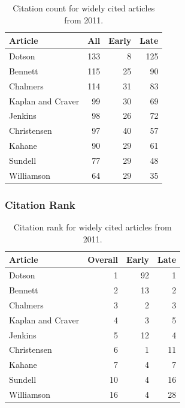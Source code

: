 \documentclass[
  10pt,
  letterpaper,
  DIV=11,
  numbers=noendperiod,
  twoside]{scrartcl}
\begin{document}
\begin{longtable}[]{@{}lrrr@{}}

\caption{\label{tbl-citation-count-2011}Citation count for widely cited
articles from 2011.}

\tabularnewline

\toprule\noalign{}
Article & All & Early & Late \\
\midrule\noalign{}
\endhead
\bottomrule\noalign{}
\endlastfoot
Dotson & 133 & 8 & 125 \\
Bennett & 115 & 25 & 90 \\
Chalmers & 114 & 31 & 83 \\
Kaplan and Craver & 99 & 30 & 69 \\
Jenkins & 98 & 26 & 72 \\
Christensen & 97 & 40 & 57 \\
Kahane & 90 & 29 & 61 \\
Sundell & 77 & 29 & 48 \\
Williamson & 64 & 29 & 35 \\

\end{longtable}

\subsubsection*{Citation Rank}\label{sec-rank-2011}

\begin{longtable}[]{@{}lrrr@{}}

\caption{\label{tbl-citation-rank-2011}Citation rank for widely cited
articles from 2011.}

\tabularnewline

\toprule\noalign{}
Article & Overall & Early & Late \\
\midrule\noalign{}
\endhead
\bottomrule\noalign{}
\endlastfoot
Dotson & 1 & 92 & 1 \\
Bennett & 2 & 13 & 2 \\
Chalmers & 3 & 2 & 3 \\
Kaplan and Craver & 4 & 3 & 5 \\
Jenkins & 5 & 12 & 4 \\
Christensen & 6 & 1 & 11 \\
Kahane & 7 & 4 & 7 \\
Sundell & 10 & 4 & 16 \\
Williamson & 16 & 4 & 28 \\

\end{longtable}
\end{document}
